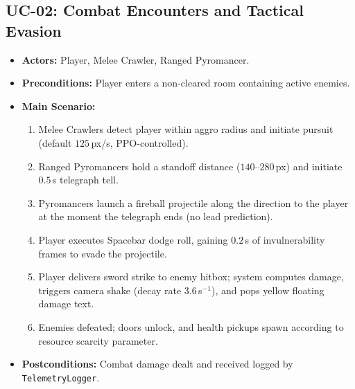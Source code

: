 \subsection{UC-02: Combat Encounters and Tactical Evasion}
\begin{itemize}
    \item \textbf{Actors:} Player, Melee Crawler, Ranged Pyromancer.
    \item \textbf{Preconditions:} Player enters a non-cleared room containing active enemies.
    \item \textbf{Main Scenario:}
    \begin{enumerate}
        \item Melee Crawlers detect player within aggro radius and initiate pursuit (default $125$\,px/s, PPO-controlled).
        \item Ranged Pyromancers hold a standoff distance ($140$--$280$\,px) and initiate $0.5$\,s telegraph tell.
        \item Pyromancers launch a fireball projectile along the direction to the player at the moment the telegraph ends (no lead prediction).
        \item Player executes Spacebar dodge roll, gaining $0.2$\,s of invulnerability frames to evade the projectile.
        \item Player delivers sword strike to enemy hitbox; system computes damage, triggers camera shake (decay rate $3.6$\,s$^{-1}$), and pops yellow floating damage text.
        \item Enemies defeated; doors unlock, and health pickups spawn according to resource scarcity parameter.
    \end{enumerate}
    \item \textbf{Postconditions:} Combat damage dealt and received logged by \texttt{TelemetryLogger}.
\end{itemize}

